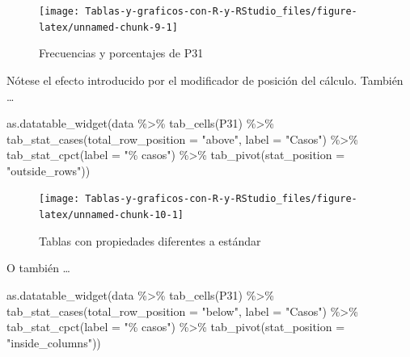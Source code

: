 \documentclass[
]{book}
\newenvironment{Shaded}{\begin{snugshade}}{\end{snugshade}}
\newcommand{\AttributeTok}[1]{\textcolor[rgb]{0.77,0.63,0.00}{#1}}
\newcommand{\FunctionTok}[1]{\textcolor[rgb]{0.00,0.00,0.00}{#1}}
\newcommand{\NormalTok}[1]{#1}
\newcommand{\SpecialCharTok}[1]{\textcolor[rgb]{0.00,0.00,0.00}{#1}}
\newcommand{\StringTok}[1]{\textcolor[rgb]{0.31,0.60,0.02}{#1}}
\begin{document}
\begin{figure}[H]

{\centering \texttt{[image: Tablas-y-graficos-con-R-y-RStudio\_files/figure-latex/unnamed-chunk-9-1]} 

}

\caption{Frecuencias y porcentajes de P31}\label{fig:unnamed-chunk-9}
\end{figure}

Nótese el efecto introducido por el modificador de posición del cálculo. También \ldots{}

\begin{Shaded}
\begin{Highlighting}[]
\FunctionTok{as.datatable\_widget}\NormalTok{(data }\SpecialCharTok{\%\textgreater{}\%}
  \FunctionTok{tab\_cells}\NormalTok{(P31) }\SpecialCharTok{\%\textgreater{}\%}
  \FunctionTok{tab\_stat\_cases}\NormalTok{(}\AttributeTok{total\_row\_position =} \StringTok{"above"}\NormalTok{, }\AttributeTok{label =} \StringTok{"Casos"}\NormalTok{) }\SpecialCharTok{\%\textgreater{}\%}
  \FunctionTok{tab\_stat\_cpct}\NormalTok{(}\AttributeTok{label =} \StringTok{"\% casos"}\NormalTok{) }\SpecialCharTok{\%\textgreater{}\%}
  \FunctionTok{tab\_pivot}\NormalTok{(}\AttributeTok{stat\_position =} \StringTok{"outside\_rows"}\NormalTok{))}
\end{Highlighting}
\end{Shaded}

\begin{figure}[H]

{\centering \texttt{[image: Tablas-y-graficos-con-R-y-RStudio\_files/figure-latex/unnamed-chunk-10-1]} 

}

\caption{Tablas con propiedades diferentes a estándar}\label{fig:unnamed-chunk-10}
\end{figure}

O también \ldots{}

\begin{Shaded}
\begin{Highlighting}[]
\FunctionTok{as.datatable\_widget}\NormalTok{(data }\SpecialCharTok{\%\textgreater{}\%}
  \FunctionTok{tab\_cells}\NormalTok{(P31) }\SpecialCharTok{\%\textgreater{}\%}
  \FunctionTok{tab\_stat\_cases}\NormalTok{(}\AttributeTok{total\_row\_position =} \StringTok{"below"}\NormalTok{, }\AttributeTok{label =} \StringTok{"Casos"}\NormalTok{) }\SpecialCharTok{\%\textgreater{}\%}
  \FunctionTok{tab\_stat\_cpct}\NormalTok{(}\AttributeTok{label =} \StringTok{"\% casos"}\NormalTok{) }\SpecialCharTok{\%\textgreater{}\%}
  \FunctionTok{tab\_pivot}\NormalTok{(}\AttributeTok{stat\_position =} \StringTok{"inside\_columns"}\NormalTok{))}
\end{Highlighting}
\end{Shaded}
\end{document}

